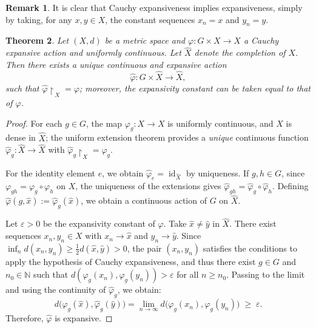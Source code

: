 \documentclass[12pt]{amsart}
\theoremstyle{plain}
\newtheorem{theorem}{Theorem}[section]
\theoremstyle{definition}
\newtheorem{remark}[theorem]{Remark}
\theoremstyle{remark}
\begin{document}
\begin{remark}
It is clear that Cauchy expansiveness implies expansiveness, simply by taking, for any \(x, y \in X\), the constant sequences \(x_n = x\) and \(y_n = y\).
\end{remark}








\begin{theorem}\label{ThmExtExp}
Let \((X,d)\) be a metric space and
\(\varphi : G \times X \longrightarrow X\) a Cauchy expansive action
and uniformly continuous. Let \(\hat{X}\) denote the completion of \(X\).
Then there exists a unique continuous and expansive action
\[
\hat{\varphi} : G \times \hat{X} \longrightarrow \hat{X},
\]
such that \(\hat{\varphi}\!\restriction_{\,X} = \varphi\);
moreover, the expansivity constant can be taken equal to that of \(\varphi\).
\end{theorem}

\begin{proof}
For each \(g \in G\), the map \(\varphi_g : X \to X\) is uniformly continuous,
and \(X\) is dense in \(\hat{X}\); the uniform extension theorem
provides a \emph{unique} continuous function
\(\hat{\varphi}_g : \hat{X} \to \hat{X}\)
with \(\hat{\varphi}_g\!\restriction_X = \varphi_g\).

\smallskip
For the identity element \(e\), we obtain
\(\hat{\varphi}_e = \operatorname{id}_{\hat{X}}\) by uniqueness.
If \(g,h \in G\), since \(\varphi_{gh} = \varphi_g \circ \varphi_h\) on \(X\),
the uniqueness of the extensions gives
\(\hat{\varphi}_{gh} = \hat{\varphi}_g \circ \hat{\varphi}_h\).
Defining
\(\hat{\varphi}(g,\hat{x}) := \hat{\varphi}_g(\hat{x})\),
we obtain a continuous action of \(G\) on \(\hat{X}\).

\smallskip
Let \(\varepsilon > 0\) be the expansivity constant of \(\varphi\).
Take \(\hat{x} \neq \hat{y}\) in \(\hat{X}\).
There exist sequences \(x_n, y_n \in X\) with \(x_n \to \hat{x}\) and \(y_n \to \hat{y}\).
Since \(\inf_n d(x_n, y_n) \ge \frac{1}{2} d(\hat{x}, \hat{y}) > 0\),
the pair \((x_n, y_n)\) satisfies the conditions to apply the hypothesis of Cauchy expansiveness, and thus there exist \(g \in G\) and \(n_0 \in \mathbb{N}\) such that
\(d(\varphi_g(x_n), \varphi_g(y_n)) > \varepsilon\) for all \(n \ge n_0\).
Passing to the limit and using the continuity of \(\hat{\varphi}_g\), we obtain:
\[
d\bigl(\hat{\varphi}_g(\hat{x}), \hat{\varphi}_g(\hat{y})\bigr)
= \lim_{n \to \infty} d\bigl(\varphi_g(x_n), \varphi_g(y_n)\bigr)
\;\ge\; \varepsilon.
\]
Therefore, \(\hat{\varphi}\) is expansive.
\end{proof}
\end{document}
